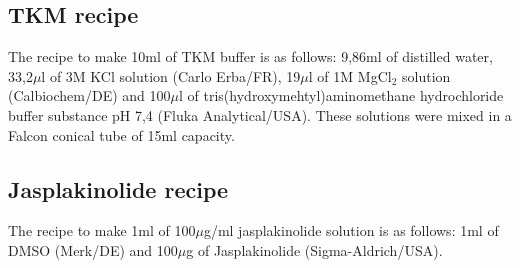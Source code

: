\documentclass[12pt, a4paper]{article} %
\begin{document}
\subsection{TKM recipe}

The recipe to make 10ml of TKM buffer is as follows: 9,86ml of distilled water, 33,2$\mu$l of 3M KCl solution (Carlo Erba/FR), 19$\mu$l of 1M MgCl$_{2}$ solution (Calbiochem/DE) and 100$\mu$l of tris(hydroxymehtyl)aminomethane hydrochloride buffer substance pH 7,4 (Fluka Analytical/USA). These solutions were mixed in a Falcon conical tube of 15ml capacity.

\subsection{Jasplakinolide recipe}

The recipe to make 1ml of 100$\mu$g/ml jasplakinolide solution is as follows: 1ml of DMSO (Merk/DE) and 100$\mu$g of Jasplakinolide (Sigma-Aldrich/USA).
\end{document}
